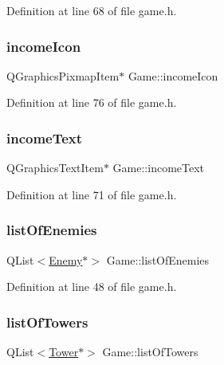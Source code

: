 Definition at line 68 of file game.\+h.

\mbox{\label{class_game_a54671774169c28677974ee423a147c39}} 
\subsubsection{\texorpdfstring{income\+Icon}{incomeIcon}}
{\footnotesize\ttfamily Q\+Graphics\+Pixmap\+Item$\ast$ Game\+::income\+Icon}



Definition at line 76 of file game.\+h.

\mbox{\label{class_game_a7d139b0ba0ef2a94966b138d5e77a034}} 
\subsubsection{\texorpdfstring{income\+Text}{incomeText}}
{\footnotesize\ttfamily Q\+Graphics\+Text\+Item$\ast$ Game\+::income\+Text}



Definition at line 71 of file game.\+h.

\mbox{\label{class_game_ab96914bfc1e59035233105abfb0787fe}} 
\subsubsection{\texorpdfstring{list\+Of\+Enemies}{listOfEnemies}}
{\footnotesize\ttfamily Q\+List$<$\hyperlink{class_enemy}{Enemy}$\ast$$>$ Game\+::list\+Of\+Enemies}



Definition at line 48 of file game.\+h.

\mbox{\label{class_game_aa0614c45667257e5be61685c33a2bec6}} 
\subsubsection{\texorpdfstring{list\+Of\+Towers}{listOfTowers}}
{\footnotesize\ttfamily Q\+List$<$\hyperlink{class_tower}{Tower}$\ast$$>$ Game\+::list\+Of\+Towers}



